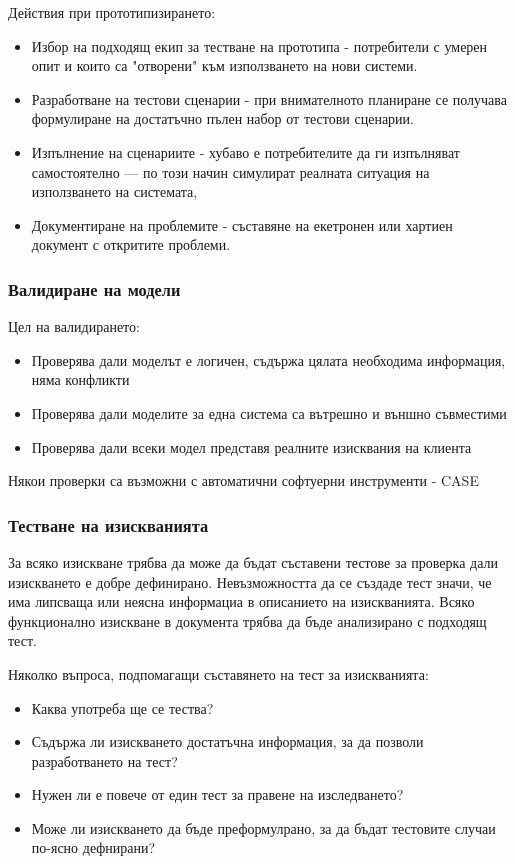 \documentclass[fleqn,12pt]{article}
\begin{document}
Действия при прототипизирането:
\begin{itemize}
	\item Избор на подходящ екип за тестване на прототипа - потребители с умерен опит и които са "отворени" към използването на нови системи.
	\item Разработване на тестови сценарии - при внимателното планиране се получава формулиране на достатъчно пълен набор от тестови сценарии.
	\item Изпълнение на сценариите - хубаво е потребителите да ги изпълняват самостоятелно --- по този начин симулират реалната ситуация на използването на системата,
	\item Документиране на проблемите - съставяне на екетронен или хартиен документ с откритите проблеми.
\end{itemize}

\subsubsection{Валидиране на модели}

Цел на валидирането:
\begin{itemize}
	\item Проверява дали моделът е логичен, съдържа цялата необходима информация, няма конфликти
	\item Проверява дали моделите за една система са вътрешно и външно съвместими
	\item Проверява дали всеки модел представя реалните изисквания на клиента
\end{itemize}

Някои проверки са възможни с автоматични софтуерни инструменти - CASE

\subsubsection{Тестване на изискванията}
За всяко изискване трябва да може да бъдат съставени тестове за проверка дали изискването е добре дефинирано. Невъзможността да се създаде тест значи, че има липсваща или неясна информациа в описанието на изискванията. Всяко функционално изискване в документа трябва да бъде анализирано с подходящ тест.

Няколко въпроса, подпомагащи съставянето на тест за изискванията:
\begin{itemize}
	\item Каква употреба ще се тества?
	\item Съдържа ли изискването достатъчна информация, за да позволи разработването на тест?
	\item Нужен ли е повече от един тест за правене на изследването?
	\item Може ли изискването да бъде преформулрано, за да бъдат тестовите случаи по-ясно дефнирани?
\end{itemize}
\end{document}
